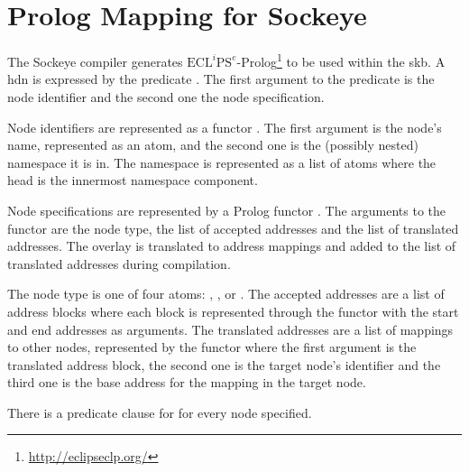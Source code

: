 \documentclass[a4paper,11pt,twoside]{report}
\begin{document}
{{{%
\chapter{Prolog Mapping for Sockeye}
\label{chap:prolog}

The Sockeye compiler generates \(\text{ECL}^i\text{PS}^e\)-Prolog\footnote{\href{http://eclipseclp.org/}{http://eclipseclp.org/}} to be used within the \gls{skb}.
A \gls{hdn} is expressed by the predicate .
The first argument to the predicate is the node identifier and the second one the node specification.

Node identifiers are represented as a functor .
The first argument is the node's name, represented as an atom, and the second one is the (possibly nested) namespace it is in.
The namespace is represented as a list of atoms where the head is the innermost namespace component.

Node specifications are represented by a Prolog functor .
The arguments to the functor are the node type, the list of accepted addresses and the list of translated addresses.
The overlay is translated to address mappings and added to the list of translated addresses during compilation.

The node type is one of four atoms: , ,  or .
The accepted addresses are a list of address blocks where each block is represented through the functor  with the start and end addresses as arguments.
The translated addresses are a list of mappings to other nodes, represented by the functor  where the first argument is the translated address block, the second one is the target node's identifier and the third one is the base address for the mapping in the target node.

There is a predicate clause for  for every node specified.

}}}
\end{document}
